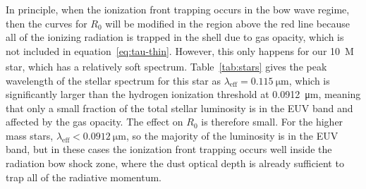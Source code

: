 \message{ !name(dusty-bow-wave.tex)}\documentclass[useAMS, usenatbib, a4paper]{mnras}
\begin{document}
In principle, when the ionization front trapping occurs in the bow
wave regime, then the curves for \(R_0\) will be modified in the
region above the red line because all of the ionizing radiation is
trapped in the shell due to gas opacity, which is not included in
equation~\eqref{eq:tau-thin}.  However, this only happens for our
\SI{10}{M_\odot} star, which has a relatively soft spectrum.
Table~\ref{tab:stars} gives the peak wavelength of the stellar
spectrum for this star as \(\lambda_{\text{eff}} = \SI{0.115}{\um}\), which
is significantly larger than the hydrogen ionization threshold at
\SI{0.0912}{\um}, meaning that only a small fraction of the total
stellar luminosity is in the EUV band and affected by the gas opacity.
The effect on \(R_0\) is therefore small.  For the higher mass stars,
\(\lambda_{\text{eff}} < \SI{0.0912}{\um}\), so the majority of the
luminosity is in the EUV band, but in these cases the ionization front
trapping occurs well inside the radiation bow shock zone, where the
dust optical depth is already sufficient to trap all of the radiative
momentum.
\end{document}
